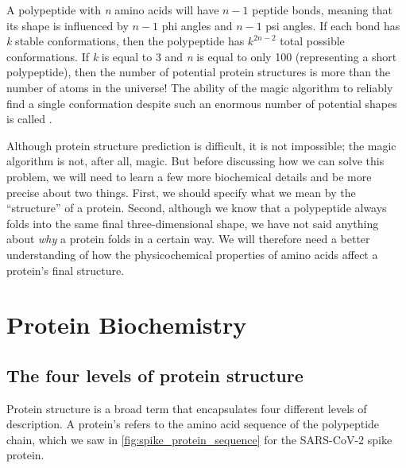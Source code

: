 A polypeptide with \textit{n} amino acids will have $n - 1$ peptide bonds, meaning that its shape is influenced by $n - 1$ phi angles and $n - 1$ psi angles. If each bond has \textit{k} stable conformations, then the polypeptide has $k^{2n-2}$ total possible conformations. If \textit{k} is equal to 3 and \textit{n} is equal to only 100 (representing a short polypeptide), then the number of potential protein structures is more than the number of atoms in the universe! The ability of the magic algorithm to reliably find a single conformation despite such an enormous number of potential shapes is called .

Although protein structure prediction is difficult, it is not impossible; the magic algorithm is not, after all, magic. But before discussing how we can solve this problem, we will need to learn a few more biochemical details and be more precise about two things. First, we should specify what we mean by the ``structure'' of a protein. Second, although we know that a polypeptide always folds into the same final three-dimensional shape, we have not said anything about \textit{why} a protein folds in a certain way. We will therefore need a better understanding of how the physicochemical properties of amino acids affect a protein's final structure.\\

\FloatBarrier
{}

\section{Protein Biochemistry}

\FloatBarrier
{}
\subsection{The four levels of protein structure}

Protein structure is a broad term that encapsulates four different levels of description. A protein's  refers to the amino acid sequence of the polypeptide chain, which we saw in \autoref{fig:spike_protein_sequence} for the SARS-CoV-2 spike protein.

